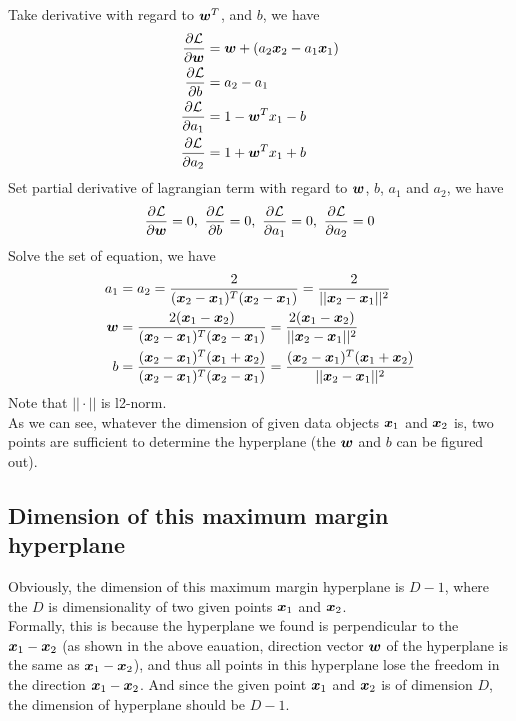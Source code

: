 \documentclass[11pt,a4paper]{article}
\newcommand{\htab}{\hspace*{0.63cm}}
\begin{document}
\htab Take derivative with regard to $\boldsymbol{w}^{T}$, and $b$, we have
\begin{align}
    \frac{\partial \mathcal{L}}{\partial \boldsymbol{w}} &= \boldsymbol{w} + (a_{2}\boldsymbol{x}_{2} - a_{1}\boldsymbol{x}_{1}) \\
    \frac{\partial \mathcal{L}}{\partial b} &= a_{2} - a_{1} \\
    \frac{\partial \mathcal{L}}{\partial a_{1}} &= 1 - \boldsymbol{w}^{T} x_{1} - b \\
    \frac{\partial \mathcal{L}}{\partial a_{2}} &= 1 + \boldsymbol{w}^{T} x_{1} + b 
    \end{align}
\htab Set partial derivative of lagrangian term with regard to $\boldsymbol{w}$, $b$, $a_{1}$ and $a_{2}$, we have
\begin{align}
    \frac{\partial \mathcal{L}}{\partial \boldsymbol{w}} = 0,\
    \frac{\partial \mathcal{L}}{\partial b} = 0,\
    \frac{\partial \mathcal{L}}{\partial a_{1}} = 0,\
    \frac{\partial \mathcal{L}}{\partial a_{2}} = 0 
    \end{align}
\htab Solve the set of equation, we have 
\begin{align}
    a_{1} &= a_{2} = \frac{2}{(\boldsymbol{x}_{2} - \boldsymbol{x}_{1})^{T}(\boldsymbol{x}_{2} - \boldsymbol{x}_{1})} 
        = \frac{2}{||\boldsymbol{x}_{2} - \boldsymbol{x}_{1}||^{2}}\\
    \boldsymbol{w} &= \frac{2(\boldsymbol{x}_{1} - \boldsymbol{x}_{2})}{(\boldsymbol{x}_{2} - \boldsymbol{x}_{1})^{T}(\boldsymbol{x}_{2} - \boldsymbol{x}_{1})}
        = \frac{2(\boldsymbol{x}_{1} - \boldsymbol{x}_{2})}{||\boldsymbol{x}_{2} - \boldsymbol{x}_{1}||^{2}}  \label{3:wsolution} \\
    b &= \frac{(\boldsymbol{x}_{2} - \boldsymbol{x}_{1})^{T}(\boldsymbol{x}_{1} + \boldsymbol{x}_{2})}{(\boldsymbol{x}_{2} - \boldsymbol{x}_{1})^{T}(\boldsymbol{x}_{2} - \boldsymbol{x}_{1})}
        = \frac{(\boldsymbol{x}_{2} - \boldsymbol{x}_{1})^{T}(\boldsymbol{x}_{1} + \boldsymbol{x}_{2})}{||\boldsymbol{x}_{2} - \boldsymbol{x}_{1}||^{2}}
    \end{align}
\htab Note that $|| \cdot ||$ is l2-norm. \\
\htab As we can see, whatever the dimension of given data objects $\boldsymbol{x}_{1}$ and $\boldsymbol{x}_{2}$ is, two points are 
sufficient to determine the hyperplane (the $\boldsymbol{w}$ and $b$ can be figured out).
\subsection{Dimension of this maximum margin hyperplane}
\htab Obviously, the dimension of this maximum margin hyperplane is $D-1$, where the $D$ is dimensionality
of two given points $\boldsymbol{x}_{1}$ and $\boldsymbol{x}_{2}$. \\
\htab Formally, this is because the 
hyperplane we found is perpendicular to the $\boldsymbol{x}_{1} - \boldsymbol{x}_{2}$ (as shown in the above eauation, 
direction vector $\boldsymbol{w}$ of the hyperplane is the same as $\boldsymbol{x}_{1} - \boldsymbol{x}_{2}$), and thus all points in this hyperplane
lose the freedom in the direction $\boldsymbol{x}_{1} - \boldsymbol{x}_{2}$. And since the given point $\boldsymbol{x}_{1}$ and $\boldsymbol{x}_{2}$ is of dimension $D$,
the dimension of hyperplane should be $D-1$.
\end{document}
